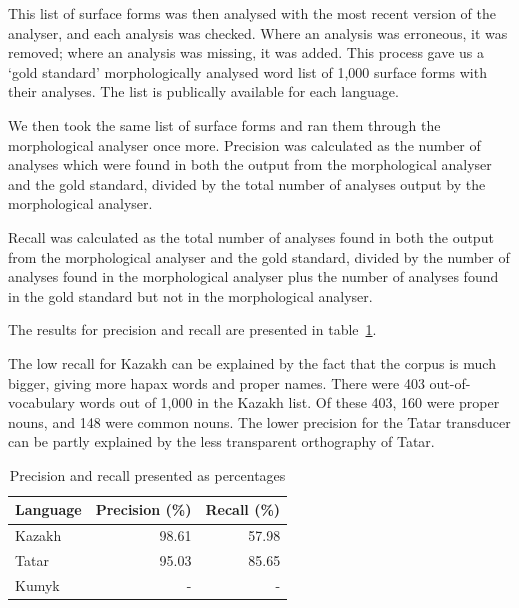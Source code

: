 \documentclass[a4paper,11pt,twocolumn]{article}
\begin{document}
This list of surface forms was then analysed with the most recent version of the analyser, and each analysis was checked.  Where an analysis was erroneous, it was removed; where an analysis was missing, it was added.  This process gave us a `gold standard' morphologically analysed word list of 1,000 surface forms with their analyses.  The list is publically available for each language.%

We then took the same list of surface forms and ran them through the morphological analyser once more.  Precision was calculated as the number of analyses which were found in both the output from the morphological analyser and the gold standard, divided by the total number of analyses output by the morphological analyser.

Recall was calculated as the total number of analyses found in both the output from the morphological analyser and the gold standard, divided by the number of analyses found in the morphological analyser plus the number of analyses found in the gold standard but not in the morphological analyser.

The results for precision and recall are presented in table~\ref{table:precrecall}. 

The low recall for Kazakh can be explained by the fact that the corpus is much bigger, giving 
more hapax words and proper names. There were 403 out-of-vocabulary words out of 1,000 in the Kazakh list.
Of these 403, 160 were proper nouns, and 148 were common nouns. The lower precision for the 
Tatar transducer can be partly explained by the less transparent orthography of Tatar. 



\begin{table}
\begin{center}
	\begin{tabular}{lrr}
	\toprule
		\textbf{Language} & \textbf{Precision (\%)} & \textbf{Recall (\%)} \\
	\midrule
		Kazakh & 98.61 &  57.98 \\
		Tatar & 95.03 & 85.65 \\
		Kumyk & - & - \\
	\bottomrule
	\end{tabular}
	\caption{Precision and recall presented as percentages}
	\label{table:precrecall}
\end{center}
\end{table}
\end{document}
